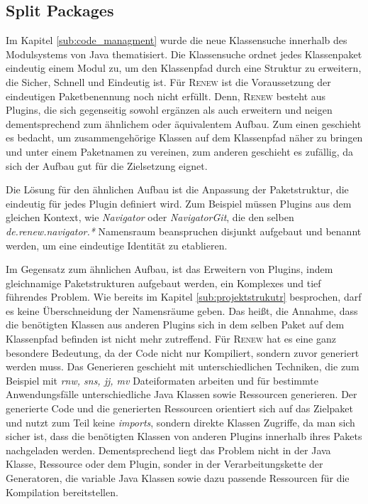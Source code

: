 	\subsection{Split Packages}
		Im Kapitel \ref{sub:code_managment}  wurde die neue Klassensuche innerhalb des Modulsystems von Java thematisiert. Die Klassensuche ordnet jedes Klassenpaket eindeutig einem Modul zu, um den Klassenpfad durch eine Struktur zu erweitern, die Sicher, Schnell und Eindeutig ist. Für \textsc{Renew} ist die Voraussetzung der eindeutigen Paketbenennung noch nicht erfüllt. Denn, \textsc{Renew} besteht aus Plugins, die sich gegenseitig sowohl ergänzen als auch erweitern und neigen dementsprechend zum ähnlichem oder äquivalentem Aufbau. Zum einen geschieht es bedacht, um zusammengehörige Klassen auf dem Klassenpfad näher zu bringen und unter einem Paketnamen zu vereinen, zum anderen geschieht es zufällig, da sich der Aufbau gut für die Zielsetzung eignet.\bigbreak

		Die Lösung für den ähnlichen Aufbau ist die Anpassung der Paketstruktur, die eindeutig für jedes Plugin definiert wird. Zum Beispiel müssen Plugins aus dem gleichen Kontext, wie \textit{Navigator} oder \textit{NavigatorGit}, die den selben \textit{de.renew.navigator.*} Namensraum beanspruchen disjunkt aufgebaut und benannt werden, um eine eindeutige Identität zu etablieren. \bigbreak

		Im Gegensatz zum ähnlichen Aufbau, ist das Erweitern von Plugins, indem gleichnamige Paketstrukturen aufgebaut werden, ein Komplexes und tief führendes Problem. Wie bereits im Kapitel \ref{sub:projektstrukutr} besprochen, darf es keine Überschneidung der Namensräume geben. Das heißt, die  Annahme, dass die benötigten Klassen aus anderen Plugins sich in dem selben Paket auf dem Klassenpfad befinden ist nicht mehr zutreffend. \newline
		Für \textsc{Renew} hat es eine ganz besondere Bedeutung, da der Code nicht nur Kompiliert, sondern zuvor generiert werden muss. Das Generieren geschieht mit unterschiedlichen Techniken, die zum Beispiel mit \textit{rnw, sns, jj, mv} Dateiformaten arbeiten und für bestimmte Anwendungsfälle unterschiedliche Java Klassen sowie Ressourcen generieren. \newline
		Der generierte Code und die generierten Ressourcen orientiert sich auf das Zielpaket und nutzt zum Teil keine \textit{imports}, sondern direkte Klassen Zugriffe, da man sich sicher ist, dass die benötigten Klassen von anderen Plugins innerhalb ihres Pakets nachgeladen werden. Dementsprechend liegt das Problem nicht in der Java Klasse, Ressource oder dem Plugin, sonder in der Verarbeitungskette der Generatoren, die variable Java Klassen sowie dazu passende Ressourcen für die Kompilation bereitstellen. \bigbreak

